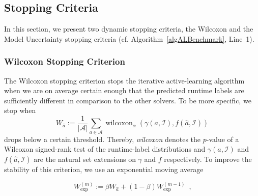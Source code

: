 \documentclass[runningheads]{llncs}
\begin{document}
\subsection{Stopping Criteria}
\label{sec:main-stopping}


In this section, we present two dynamic stopping criteria, the Wilcoxon and the Model Uncertainty stopping criteria (cf. Algorithm~\ref{algALBenchmark}, Line~1). 


\subsubsection{Wilcoxon Stopping Criterion}
The Wilcoxon stopping criterion stops the iterative active-learning algorithm when we are on average certain enough that the predicted runtime labels are sufficiently different in comparison to the other solvers.
To be more specific, we stop when
\begin{equation}
  W_{\hat{a}} := \frac{1}{\left\lvert \mathcal{A} \right\rvert} \sum_{a \in \mathcal{A}} \operatorname{wilcoxon}_{\alpha}\!\left(\gamma\!\left(a, \mathcal{I}\right), f\!\left(\hat{a}, \mathcal{I}\right) \right)
\end{equation}
drops below a certain threshold.
Thereby, \emph{wilcoxon} denotes the $p$-value of a Wilcoxon signed-rank test of the runtime-label distributions and $\gamma\!\left(a, \mathcal{I}\right)$ and $f\!\left(\hat{a}, \mathcal{I}\right)$ are the natural set extensions on $\gamma$ and $f$ respectively.
To improve the stability of this criterion, we use an exponential moving average

\begin{equation}
  W_{\exp}^{\left(m\right)} := \beta W_{\hat{a}} + \left(1 - \beta\right) W_{\exp}^{\left(m - 1\right)} \enspace \textrm{,}
\end{equation}
\end{document}
